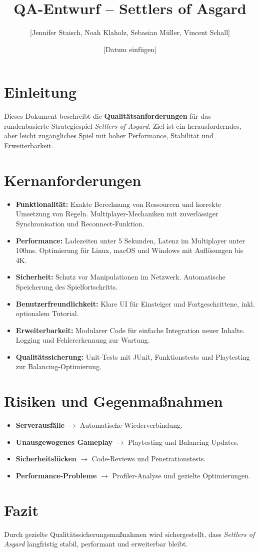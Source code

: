 \documentclass[a4paper,12pt]{article}
\title{\textbf{QA-Entwurf -- Settlers of Asgard}}
\author{[Jennifer Staisch, Noah Klaholz, Sebasian Müller, Vincent Schall]}
\date{[Datum einfügen]}
\begin{document}
    \maketitle

    \section*{Einleitung}
    Dieses Dokument beschreibt die \textbf{Qualitätsanforderungen} für das rundenbasierte Strategiespiel \textit{Settlers of Asgard}. Ziel ist ein herausforderndes, aber leicht zugängliches Spiel mit hoher Performance, Stabilität und Erweiterbarkeit.

    \section*{Kernanforderungen}
    \begin{itemize}[leftmargin=0.5cm]
        \item \textbf{Funktionalität:} Exakte Berechnung von Ressourcen und korrekte Umsetzung von Regeln. Multiplayer-Mechaniken mit zuverlässiger Synchronisation und Reconnect-Funktion.
        \item \textbf{Performance:} Ladezeiten unter 5 Sekunden, Latenz im Multiplayer unter 100ms. Optimierung für Linux, macOS und Windows mit Auflösungen bis 4K.
        \item \textbf{Sicherheit:} Schutz vor Manipulationen im Netzwerk. Automatische Speicherung des Spielfortschritts.
        \item \textbf{Benutzerfreundlichkeit:} Klare UI für Einsteiger und Fortgeschrittene, inkl. optionalem Tutorial.
        \item \textbf{Erweiterbarkeit:} Modularer Code für einfache Integration neuer Inhalte. Logging und Fehlererkennung zur Wartung.
        \item \textbf{Qualitätssicherung:} Unit-Tests mit JUnit, Funktionstests und Playtesting zur Balancing-Optimierung.
    \end{itemize}

    \section*{Risiken und Gegenmaßnahmen}
    \begin{itemize}[leftmargin=0.5cm]
        \item \textbf{Serverausfälle} $\rightarrow$ Automatische Wiederverbindung.
        \item \textbf{Unausgewogenes Gameplay} $\rightarrow$ Playtesting und Balancing-Updates.
        \item \textbf{Sicherheitslücken} $\rightarrow$ Code-Reviews und Penetrationstests.
        \item \textbf{Performance-Probleme} $\rightarrow$ Profiler-Analyse und gezielte Optimierungen.
    \end{itemize}

    \section*{Fazit}
    Durch gezielte Qualitätssicherungsmaßnahmen wird sichergestellt, dass \textit{Settlers of Asgard} langfristig stabil, performant und erweiterbar bleibt.
\end{document}
